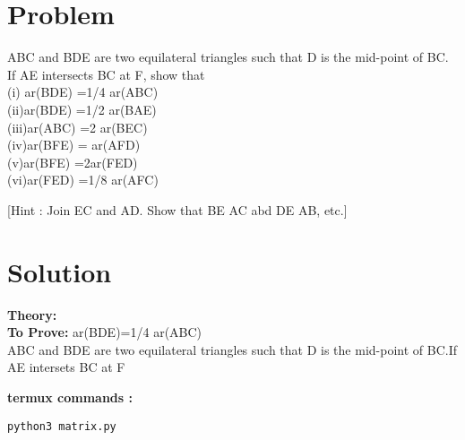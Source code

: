 \documentclass[10pt, a4paper]{article}
\title{\mytitle}
\author{\myauthor\hspace{1em}\\\contact\\FWC22040\hspace{6.5em}IITH\hspace{0.5em}\mymodule\hspace{6em}ASSIGN-5}
\date{}
\begin{document}
 \maketitle
 \tableofcontents
   \section{Problem}
  ABC and BDE are two equilateral
triangles such that D is the mid-point of BC. If AE
intersects BC at F, show that\\
(i) ar(BDE) =1/4 ar(ABC)\\
(ii)ar(BDE) =1/2 ar(BAE)\\
(iii)ar(ABC) =2 ar(BEC)\\
(iv)ar(BFE) = ar(AFD)\\
(v)ar(BFE) =2ar(FED)\\
(vi)ar(FED) =1/8 ar(AFC)


[Hint : Join EC and AD. Show that BE  AC abd DE AB, etc.]

   \section{Solution}
   \textbf{Theory:}\\
   \textbf{To Prove:} ar(BDE)=1/4 ar(ABC) \\
   ABC and BDE are two equilateral triangles such that D is the mid-point of BC.If AE intersets BC at F


\textbf{termux commands :}
\begin{lstlisting}
python3 matrix.py
\end{lstlisting}
\end{document}

